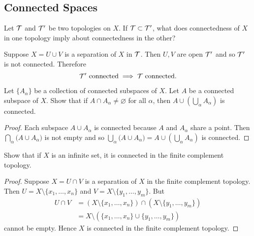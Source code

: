 \subsection{Connected Spaces}
\begin{ex}{23.1}
    Let $\mathcal{T}$ and $\mathcal{T}'$ be two topologies on $X$. If $\mathcal{T}\subset\mathcal{T}'$, what does connectedness of $X$ in one topology imply about connectedness in the other?
\end{ex}
\begin{sol}
    Suppose $X=U\cup V$ is a separation of $X$ in $\mathcal{T}$. 
    Then $U,V$ are open $\mathcal{T}'$ and so $\mathcal{T}'$ is not connected. Therefore
    $$\mathcal{T}'\text{ connected}\implies\mathcal{T}\text{ connected}.$$
\end{sol}

\begin{ex}{23.3}
    Let $\{A_\alpha\}$ be a collection of connected subspaces of $X$. Let $A$ be a connected subspace of $X$.
    Show that if $A\cap A_\alpha\neq\varnothing$ for all $\alpha$, then $A\cup\left(\bigcup_\alpha A_\alpha\right)$ is connected.
\end{ex}
\begin{proof}
   Each subspace $A\cup A_\alpha$ is connected because $A$ and $A_\alpha$ share a point.
   Then $\bigcap_\alpha \big(A\cup A_\alpha\big)$ is not empty and so $\bigcup_\alpha\big(A\cup A_\alpha\big)=A\cup\left(\bigcup_\alpha A_\alpha\right)$ is connected.
\end{proof}

\begin{ex}{23.4}
    Show that if $X$ is an infinite set, it is connected in the finite complement topology.
\end{ex}
\begin{proof}
    Suppose $X=U\cap V$ is a separation of $X$ in the finite complement topology.
    Then $U = X\setminus\{x_1,\dots, x_n\}$ and $V =X\setminus\{y_1,\dots, y_m\}$.
    But 
    \begin{align*}
        U\cap V &=\left(X\setminus\{x_1,\dots, x_n\}\right)\cap\left(X\setminus\{y_1,\dots, y_m\}\right)\\
        &=X\setminus\left(\{x_1,\dots,x_n\}\cup\{y_1,\dots,y_m\}\right)
    \end{align*}
    cannot be empty. Hence $X$ is connected in the finite complement topology.
\end{proof}

